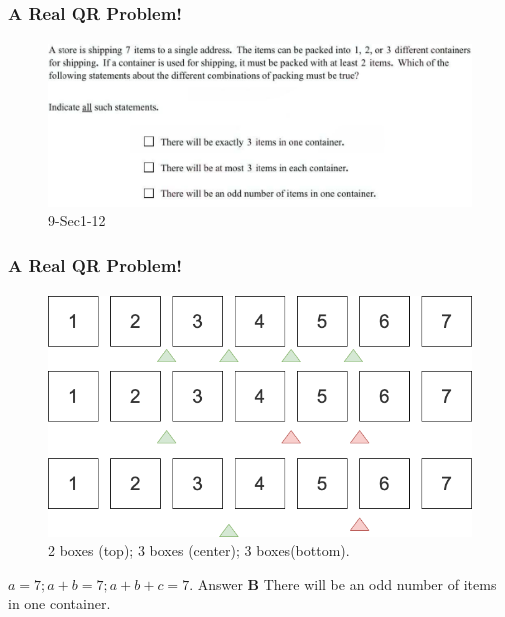 \documentclass[
	11pt, %
]{beamer}
\begin{document}

\begin{frame}
	\frametitle{A Real QR Problem!}
	\framesubtitle{}
	\begin{figure}
		\includegraphics[width=\linewidth]{Combinations_Example_Question.png}
		\caption{9-Sec1-12}
	\end{figure}
	
\end{frame}


\begin{frame}
	\frametitle{A Real QR Problem!}
	\framesubtitle{}
	\pause
	\begin{figure}
		\includegraphics[width=0.5\linewidth]{Boxes.png}
		\caption{ 2 boxes (top); 3 boxes (center); 3 boxes(bottom).}
	\end{figure}
\pause
$ a  = 7; a + b = 7; a + b + c = 7.$
\pause
\bigskip
Answer \textbf{B } There will be an odd number of items in one container.
\end{frame}

\end{document}
